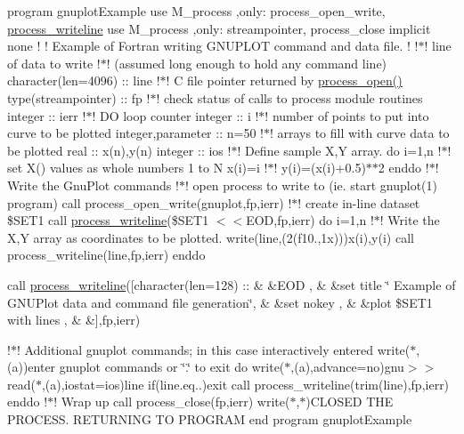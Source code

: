 program gnuplot\+Example use M\+\_\+process ,only\+: process\+\_\+open\+\_\+write, \mbox{\hyperlink{interfacem__process_1_1process__writeline}{process\+\_\+writeline}} use M\+\_\+process ,only\+: streampointer, process\+\_\+close implicit none ! ! Example of Fortran writing G\+N\+U\+P\+L\+OT command and data file. ! !$\ast$! line of data to write !$\ast$! (assumed long enough to hold any command line) character(len=4096) \+:\+: line !$\ast$! C file pointer returned by \mbox{\hyperlink{namespacem__process_a3c0f543a9ceff2671041d73660f60a59}{process\+\_\+open()}} type(streampointer) \+:\+: fp !$\ast$! check status of calls to process module routines integer \+:\+: ierr !$\ast$! DO loop counter integer \+:\+: i !$\ast$! number of points to put into curve to be plotted integer,parameter \+:\+: n=50 !$\ast$! arrays to fill with curve data to be plotted real \+:\+: x(n),y(n) integer \+:\+: ios !$\ast$! Define sample X,Y array. do i=1,n !$\ast$! set X() values as whole numbers 1 to N x(i)=i !$\ast$! y(i)=(x(i)+0.5)$\ast$$\ast$2 enddo !$\ast$! Write the Gnu\+Plot commands !$\ast$! open process to write to (ie. start gnuplot(1) program) call process\+\_\+open\+\_\+write(\textquotesingle{}gnuplot\textquotesingle{},fp,ierr) !$\ast$! create in-\/line dataset \$\+S\+E\+T1 call \mbox{\hyperlink{interfacem__process_1_1process__writeline}{process\+\_\+writeline}}(\textquotesingle{}\$\+S\+E\+T1 $<$$<$E\+OD\textquotesingle{},fp,ierr) do i=1,n !$\ast$! Write the X,Y array as coordinates to be plotted. write(line,\textquotesingle{}(2(f10.,1x))\textquotesingle{})x(i),y(i) call process\+\_\+writeline(line,fp,ierr) enddo

call \mbox{\hyperlink{interfacem__process_1_1process__writeline}{process\+\_\+writeline}}(\mbox{[}character(len=128) \+:\+: \& \&\textquotesingle{}E\+OD \textquotesingle{}, \& \&\textquotesingle{}set title \char`\"{} Example of G\+N\+U\+Plot data and command file generation\char`\"{}\textquotesingle{}, \& \&\textquotesingle{}set nokey\textquotesingle{} , \& \&\textquotesingle{}plot \$\+S\+E\+T1 with lines\textquotesingle{} , \& \&\textquotesingle{}\textquotesingle{}\mbox{]},fp,ierr)

!$\ast$! Additional gnuplot commands; in this case interactively entered write($\ast$,\textquotesingle{}(a)\textquotesingle{})\textquotesingle{}enter gnuplot commands or \char`\"{}.\char`\"{} to exit\textquotesingle{} do write($\ast$,\textquotesingle{}(a)\textquotesingle{},advance=\textquotesingle{}no\textquotesingle{})\textquotesingle{}gnu$>$$>$\textquotesingle{} read($\ast$,\textquotesingle{}(a)\textquotesingle{},iostat=ios)line if(line.\+eq.\textquotesingle{}.\textquotesingle{})exit call process\+\_\+writeline(trim(line),fp,ierr) enddo !$\ast$! Wrap up call process\+\_\+close(fp,ierr) write($\ast$,$\ast$)\textquotesingle{}C\+L\+O\+S\+ED T\+HE P\+R\+O\+C\+E\+SS. R\+E\+T\+U\+R\+N\+I\+NG TO P\+R\+O\+G\+R\+AM\textquotesingle{} end program gnuplot\+Example


